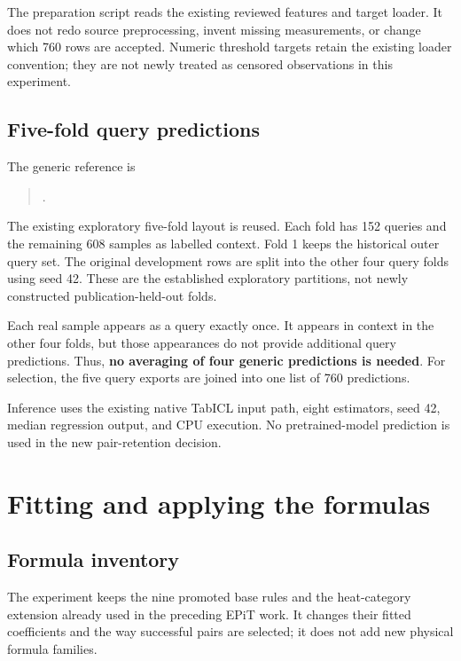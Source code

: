 \documentclass[11pt]{article}
\begin{document}
The preparation script reads the existing reviewed features and target loader.
It does not redo source preprocessing, invent missing measurements, or change
which 760 rows are accepted. Numeric threshold targets retain the existing
loader convention; they are not newly treated as censored observations in this
experiment.

\subsection{Five-fold query predictions}
The generic reference is
\begin{quote}\small
{}.
\end{quote}
The existing exploratory five-fold layout is reused. Each fold has 152 queries
and the remaining 608 samples as labelled context. Fold 1 keeps the historical
outer query set. The original development rows are split into the other four
query folds using seed 42. These are the established exploratory partitions,
not newly constructed publication-held-out folds.

Each real sample appears as a query exactly once. It appears in context in the
other four folds, but those appearances do not provide additional query
predictions. Thus, \textbf{no averaging of four generic predictions is needed}.
For selection, the five query exports are joined into one list of 760 predictions.

Inference uses the existing native TabICL input path, eight estimators, seed 42,
median regression output, and CPU execution. No pretrained-model prediction is
used in the new pair-retention decision.

\section{Fitting and applying the formulas}
\subsection{Formula inventory}
The experiment keeps the nine promoted base rules and the heat-category
extension already used in the preceding EPiT work. It changes their fitted
coefficients and the way successful pairs are selected; it does not add new
physical formula families.
\end{document}
